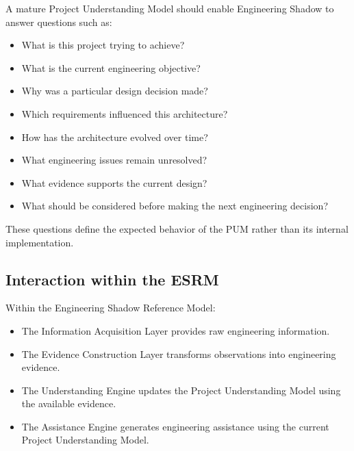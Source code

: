 A mature Project Understanding Model should enable Engineering Shadow to answer questions such as:

\begin{itemize}

\item What is this project trying to achieve?

\item What is the current engineering objective?

\item Why was a particular design decision made?

\item Which requirements influenced this architecture?

\item How has the architecture evolved over time?

\item What engineering issues remain unresolved?

\item What evidence supports the current design?

\item What should be considered before making the next engineering decision?

\end{itemize}

These questions define the expected behavior of the PUM rather than its internal implementation.


\subsection{Interaction within the ESRM}

Within the Engineering Shadow Reference Model:

\begin{itemize}

\item The Information Acquisition Layer provides raw engineering information.

\item The Evidence Construction Layer transforms observations into engineering evidence.

\item The Understanding Engine updates the Project Understanding Model using the available evidence.

\item The Assistance Engine generates engineering assistance using the current Project Understanding Model.

\end{itemize}


